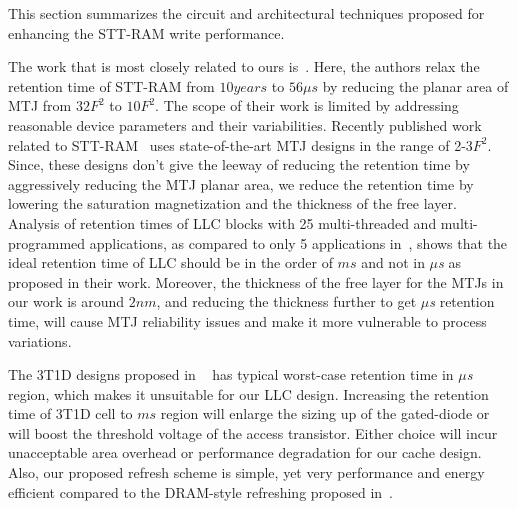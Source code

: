 


This section summarizes the circuit and architectural techniques proposed for enhancing the STT-RAM
write performance.

The work that is most closely related to ours is~\cite{STTRAM:HPCA11}.
Here, the authors relax the retention time of STT-RAM from $10 years$ to $56 \mu s$ by
reducing the planar area of MTJ from $32F^2$ to $10F^2$. The scope of their work is limited by
addressing reasonable device parameters and their variabilities. Recently published work related to
STT-RAM~\cite{PMTJ:Toshiba08,STTRAM:EDL11,STTRAM:Qualcomm09,STTRAM:Grandis11}
uses state-of-the-art MTJ designs in the range of 2-3$F^2$. Since, these designs don't give the
leeway of reducing the retention time by aggressively reducing the MTJ planar area, we reduce the
retention time by lowering the saturation magnetization and the thickness of the free layer.
Analysis of retention times of LLC blocks with 25 multi-threaded and multi-programmed applications,
as compared to only 5 applications in~\cite{STTRAM:HPCA11}, shows that
the ideal retention time of LLC should be in the order of $ms$ and not in {\it $\mu$s} as proposed
in their work. Moreover, the thickness of the free layer
for the MTJs in our work is around $2nm$, and reducing the thickness further
to get {\it $\mu$s} retention time, will cause MTJ reliability issues
and make it more vulnerable to process variations.

The 3T1D designs proposed in ~\cite{3T-brooks} has typical worst-case retention time in {\it $\mu$s} region, which makes it unsuitable for our LLC design. Increasing the retention time of 3T1D cell to $ms$ region will enlarge the sizing up of the gated-diode or will boost the threshold voltage of the access transistor. Either choice will incur unacceptable area overhead or performance degradation for our cache design. Also, our proposed refresh scheme is simple, yet very performance and energy efficient compared to the DRAM-style refreshing proposed in~\cite{STTRAM:HPCA11}.

